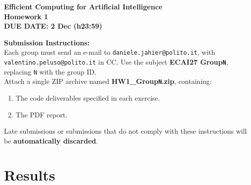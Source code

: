 \documentclass[a4paper,11pt]{article}
\begin{document}
\begin{tcolorbox}[
    colback=white,
    colframe=black,
    width=\textwidth,
    arc=3mm,
    boxrule=1pt
]
\begin{center}
    \Large \textbf{Efficient Computing for Artificial Intelligence}\\[3pt]
    \large \textbf{Homework 1}\\[5pt]
    \textbf{\colorbox{yellow!30}{DUE DATE: 2 Dec (h23:59)}}\\[8pt]
\end{center}

\textbf{Submission Instructions:}\\[3pt]

Each group must send an e-mail to
\texttt{daniele.jahier@polito.it}, with
\texttt{valentino.peluso@polito.it} in CC.
Use the subject
\textbf{ECAI27 Group\texttt{N}}, replacing \texttt{N} with
the group ID.\\[3pt]

Attach a single ZIP archive named
\textbf{HW1\_Group\texttt{N}.zip}, containing:
\begin{enumerate}
    \item The code deliverables specified in each exercise.
    \item The PDF report.
\end{enumerate}

Late submissions or submissions that do not comply with these
instructions will be \textbf{automatically discarded}.
\end{tcolorbox}


\section*{Results}
\end{document}
